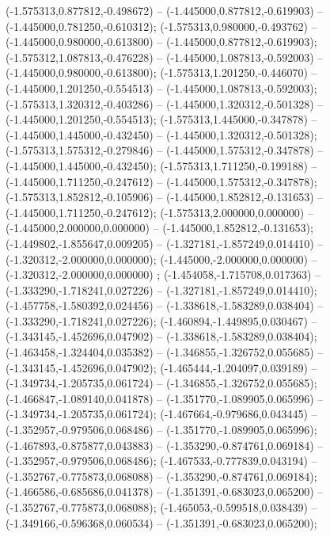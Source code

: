  (-1.575313,0.877812,-0.498672) -- (-1.445000,0.877812,-0.619903) -- (-1.445000,0.781250,-0.610312);
 (-1.575313,0.980000,-0.493762) -- (-1.445000,0.980000,-0.613800) -- (-1.445000,0.877812,-0.619903);
 (-1.575312,1.087813,-0.476228) -- (-1.445000,1.087813,-0.592003) -- (-1.445000,0.980000,-0.613800);
 (-1.575313,1.201250,-0.446070) -- (-1.445000,1.201250,-0.554513) -- (-1.445000,1.087813,-0.592003);
 (-1.575313,1.320312,-0.403286) -- (-1.445000,1.320312,-0.501328) -- (-1.445000,1.201250,-0.554513);
 (-1.575313,1.445000,-0.347878) -- (-1.445000,1.445000,-0.432450) -- (-1.445000,1.320312,-0.501328);
 (-1.575313,1.575312,-0.279846) -- (-1.445000,1.575312,-0.347878) -- (-1.445000,1.445000,-0.432450);
 (-1.575313,1.711250,-0.199188) -- (-1.445000,1.711250,-0.247612) -- (-1.445000,1.575312,-0.347878);
 (-1.575313,1.852812,-0.105906) -- (-1.445000,1.852812,-0.131653) -- (-1.445000,1.711250,-0.247612);
 (-1.575313,2.000000,0.000000) -- (-1.445000,2.000000,0.000000) -- (-1.445000,1.852812,-0.131653);
 (-1.449802,-1.855647,0.009205) -- (-1.327181,-1.857249,0.014410) -- (-1.320312,-2.000000,0.000000);
 (-1.445000,-2.000000,0.000000) -- (-1.320312,-2.000000,0.000000) ;
 (-1.454058,-1.715708,0.017363) -- (-1.333290,-1.718241,0.027226) -- (-1.327181,-1.857249,0.014410);
 (-1.457758,-1.580392,0.024456) -- (-1.338618,-1.583289,0.038404) -- (-1.333290,-1.718241,0.027226);
 (-1.460894,-1.449895,0.030467) -- (-1.343145,-1.452696,0.047902) -- (-1.338618,-1.583289,0.038404);
 (-1.463458,-1.324404,0.035382) -- (-1.346855,-1.326752,0.055685) -- (-1.343145,-1.452696,0.047902);
 (-1.465444,-1.204097,0.039189) -- (-1.349734,-1.205735,0.061724) -- (-1.346855,-1.326752,0.055685);
 (-1.466847,-1.089140,0.041878) -- (-1.351770,-1.089905,0.065996) -- (-1.349734,-1.205735,0.061724);
 (-1.467664,-0.979686,0.043445) -- (-1.352957,-0.979506,0.068486) -- (-1.351770,-1.089905,0.065996);
 (-1.467893,-0.875877,0.043883) -- (-1.353290,-0.874761,0.069184) -- (-1.352957,-0.979506,0.068486);
 (-1.467533,-0.777839,0.043194) -- (-1.352767,-0.775873,0.068088) -- (-1.353290,-0.874761,0.069184);
 (-1.466586,-0.685686,0.041378) -- (-1.351391,-0.683023,0.065200) -- (-1.352767,-0.775873,0.068088);
 (-1.465053,-0.599518,0.038439) -- (-1.349166,-0.596368,0.060534) -- (-1.351391,-0.683023,0.065200);
